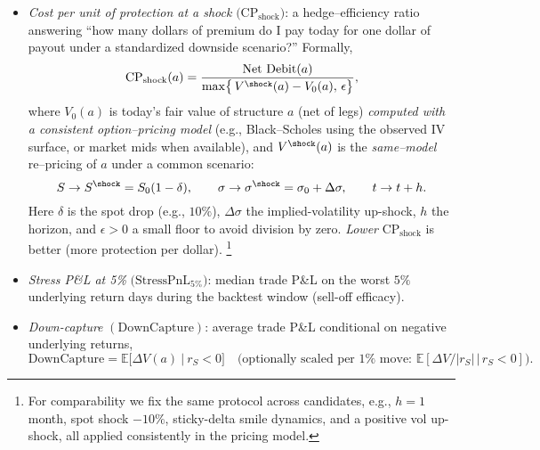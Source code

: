 \documentclass[12pt,a4paper]{report}
\begin{document}
\begin{itemize}
        \item \emph{Cost per unit of protection at a shock} $\big(\mathrm{CP}_{\text{shock}}\big)$: 
        a hedge–efficiency ratio answering “how many dollars of premium do I pay today for one dollar of payout under a standardized downside scenario?” Formally,
        \[
        \mathrm{CP}_{\text{shock}}(a)
        =\frac{\text{Net Debit}(a)}{\max\!\big\{\,V^{\shock}(a)-V_0(a),\,\epsilon\big\}},
        \]
        where $V_0(a)$ is today’s fair value of structure $a$ (net of legs) \emph{computed with a consistent option–pricing model} (e.g., Black–Scholes using the observed IV surface, or market mids when available), and $V^{\shock}(a)$ is the \emph{same–model} re–pricing of $a$ under a common scenario:
        \[
        S\to S^{\shock}=S_0(1-\delta),\qquad 
        \sigma\to\sigma^{\shock}=\sigma_0+\Delta\sigma,\qquad
        t\to t+h.
        \]
        Here $\delta$ is the spot drop (e.g., $10\%$), $\Delta\sigma$ the implied-volatility up-shock, $h$ the horizon, and $\epsilon>0$ a small floor to avoid division by zero. \emph{Lower} $\mathrm{CP}_{\text{shock}}$ is better (more protection per dollar).
        \footnote{For comparability we fix the same protocol across candidates, e.g., $h=1$ month, spot shock $-10\%$, sticky-delta smile dynamics, and a positive vol up-shock, all applied consistently in the pricing model.}
        
        
        \item \emph{Stress P\&L at 5\%} $\big(\mathrm{StressPnL}_{5\%}\big)$:
        median trade P\&L on the worst $5\%$ underlying return days during the backtest window (sell-off efficacy).
        
        \item \emph{Down-capture} $(\mathrm{DownCapture})$:
        average trade P\&L conditional on negative underlying returns,
        \[
        \mathrm{DownCapture}=\mathbb{E}\big[\Delta V(a)\ \big|\ r_S<0\big]
        \quad
        \text{(optionally scaled per $1\%$ move: }\mathbb{E}[\Delta V/|r_S|\,|\,r_S<0]\text{)}.
        \]


\end{itemize}
\end{document}
